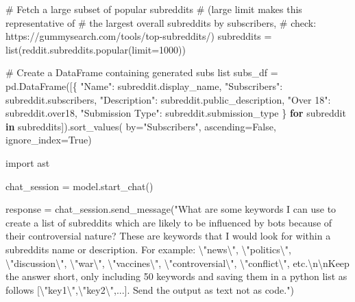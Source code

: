 \documentclass[
  letterpaper,
  DIV=11,
  numbers=noendperiod]{scrartcl}
\newenvironment{Shaded}{\begin{snugshade}}{\end{snugshade}}
\newcommand{\BuiltInTok}[1]{\textcolor[rgb]{0.00,0.23,0.31}{#1}}
\newcommand{\CharTok}[1]{\textcolor[rgb]{0.13,0.47,0.30}{#1}}
\newcommand{\CommentTok}[1]{\textcolor[rgb]{0.37,0.37,0.37}{#1}}
\newcommand{\ControlFlowTok}[1]{\textcolor[rgb]{0.00,0.23,0.31}{\textbf{#1}}}
\newcommand{\DecValTok}[1]{\textcolor[rgb]{0.68,0.00,0.00}{#1}}
\newcommand{\ImportTok}[1]{\textcolor[rgb]{0.00,0.46,0.62}{#1}}
\newcommand{\KeywordTok}[1]{\textcolor[rgb]{0.00,0.23,0.31}{\textbf{#1}}}
\newcommand{\NormalTok}[1]{\textcolor[rgb]{0.00,0.23,0.31}{#1}}
\newcommand{\OperatorTok}[1]{\textcolor[rgb]{0.37,0.37,0.37}{#1}}
\newcommand{\StringTok}[1]{\textcolor[rgb]{0.13,0.47,0.30}{#1}}
\newcommand{\VariableTok}[1]{\textcolor[rgb]{0.07,0.07,0.07}{#1}}
\begin{document}
\begin{Shaded}
\begin{Highlighting}[]
\CommentTok{\# Fetch a large subset of popular subreddits}
\CommentTok{\# (large limit makes this representative of}
\CommentTok{\# the largest overall subreddits by subscribers,}
\CommentTok{\# check: https://gummysearch.com/tools/top{-}subreddits/)}
\NormalTok{subreddits }\OperatorTok{=} \BuiltInTok{list}\NormalTok{(reddit.subreddits.popular(limit}\OperatorTok{=}\DecValTok{1000}\NormalTok{))}

\CommentTok{\# Create a DataFrame containing generated subs list}
\NormalTok{subs\_df }\OperatorTok{=}\NormalTok{ pd.DataFrame([\{}
    \StringTok{"Name"}\NormalTok{: subreddit.display\_name,}
    \StringTok{"Subscribers"}\NormalTok{: subreddit.subscribers,}
    \StringTok{"Description"}\NormalTok{: subreddit.public\_description,}
    \StringTok{"Over 18"}\NormalTok{: subreddit.over18,}
    \StringTok{"Submission Type"}\NormalTok{: subreddit.submission\_type}
\NormalTok{\} }\ControlFlowTok{for}\NormalTok{ subreddit }\KeywordTok{in}\NormalTok{ subreddits]).sort\_values(}
\NormalTok{    by}\OperatorTok{=}\StringTok{"Subscribers"}\NormalTok{, ascending}\OperatorTok{=}\VariableTok{False}\NormalTok{, ignore\_index}\OperatorTok{=}\VariableTok{True}\NormalTok{)}

\ImportTok{import}\NormalTok{ ast}

\NormalTok{chat\_session }\OperatorTok{=}\NormalTok{ model.start\_chat()}

\NormalTok{response }\OperatorTok{=}\NormalTok{ chat\_session.send\_message(}\StringTok{"What are some keywords I can use to create a list of subreddits which are likely to be influenced by bots because of their controversial nature? These are keywords that I would look for within a subreddit\textquotesingle{}s name or description. For example: }\CharTok{\textbackslash{}"}\StringTok{news}\CharTok{\textbackslash{}"}\StringTok{, }\CharTok{\textbackslash{}"}\StringTok{politics}\CharTok{\textbackslash{}"}\StringTok{, }\CharTok{\textbackslash{}"}\StringTok{discussion}\CharTok{\textbackslash{}"}\StringTok{, }\CharTok{\textbackslash{}"}\StringTok{war}\CharTok{\textbackslash{}"}\StringTok{, }\CharTok{\textbackslash{}"}\StringTok{vaccines}\CharTok{\textbackslash{}"}\StringTok{, }\CharTok{\textbackslash{}"}\StringTok{controversial}\CharTok{\textbackslash{}"}\StringTok{, }\CharTok{\textbackslash{}"}\StringTok{conflict}\CharTok{\textbackslash{}"}\StringTok{, etc.}\CharTok{\textbackslash{}n\textbackslash{}n}\StringTok{Keep the answer short, only including 50 keywords and saving them in a python list as follows [}\CharTok{\textbackslash{}"}\StringTok{key1}\CharTok{\textbackslash{}"}\StringTok{,}\CharTok{\textbackslash{}"}\StringTok{key2}\CharTok{\textbackslash{}"}\StringTok{,...]. Send the output as text not as code."}\NormalTok{)}


\end{Highlighting}
\end{Shaded}
\end{document}
